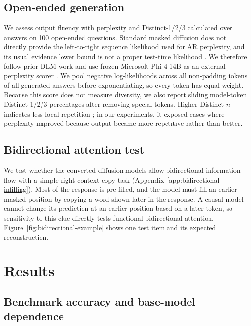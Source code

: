 \documentclass{article}
\begin{document}
\subsection{Open-ended generation}
We assess output fluency with perplexity and Distinct-1/2/3 calculated over answers on 100 open-ended questions. Standard masked diffusion does not directly provide the left-to-right sequence likelihood used for AR perplexity, and its usual evidence lower bound is not a proper test-time likelihood \citep{turok2026duel}. We therefore follow prior DLM work and use frozen Microsoft Phi-4 14B as an external perplexity scorer \citep{gong2025diffullama}. We pool negative log-likelihoods across all non-padding tokens of all generated answers before exponentiating, so every token has equal weight. Because this score does not measure diversity, we also report sliding model-token Distinct-1/2/3 percentages after removing special tokens. Higher Distinct-$n$ indicates less local repetition \citep{li2016diversity}; in our experiments, it exposed cases where perplexity improved because output became more repetitive rather than better.

\subsection{Bidirectional attention test}
We test whether the converted diffusion models allow bidirectional information flow with a simple right-context copy task (Appendix~\ref{app:bidirectional-infilling}). Most of the response is pre-filled, and the model must fill an earlier masked position by copying a word shown later in the response. A causal model cannot change its prediction at an earlier position based on a later token, so sensitivity to this clue directly tests functional bidirectional attention. Figure~\ref{fig:bidirectional-example} shows one test item and its expected reconstruction.

\section{Results}

\subsection{Benchmark accuracy and base-model dependence}
\end{document}
